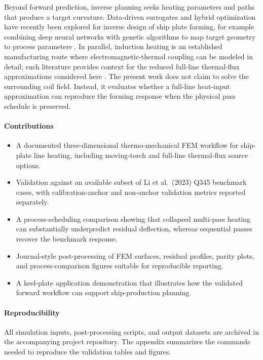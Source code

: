 Beyond forward prediction, inverse planning seeks heating parameters and paths that produce a target curvature. Data-driven surrogates and hybrid optimization have recently been explored for inverse design of ship plate forming, for example combining deep neural networks with genetic algorithms to map target geometry to process parameters \cite{yang2025}. In parallel, induction heating is an established manufacturing route where electromagnetic-thermal coupling can be modeled in detail; such literature provides context for the reduced full-line thermal-flux approximations considered here \cite{rast2018}. The present work does not claim to solve the surrounding coil field. Instead, it evaluates whether a full-line heat-input approximation can reproduce the forming response when the physical pass schedule is preserved.

\paragraph{Contributions}
\begin{itemize}
  \item A documented three-dimensional thermo-mechanical FEM workflow for ship-plate line heating, including moving-torch and full-line thermal-flux source options.
  \item Validation against an available subset of Li et al.\ (2023) Q345 benchmark cases, with calibration-anchor and non-anchor validation metrics reported separately.
  \item A process-scheduling comparison showing that collapsed multi-pass heating can substantially underpredict residual deflection, whereas sequential passes recover the benchmark response.
  \item Journal-style post-processing of FEM surfaces, residual profiles, parity plots, and process-comparison figures suitable for reproducible reporting.
  \item A keel-plate application demonstration that illustrates how the validated forward workflow can support ship-production planning.
\end{itemize}

\paragraph{Reproducibility}
All simulation inputs, post-processing scripts, and output datasets are archived in the accompanying project repository. The appendix summarizes the commands needed to reproduce the validation tables and figures.
